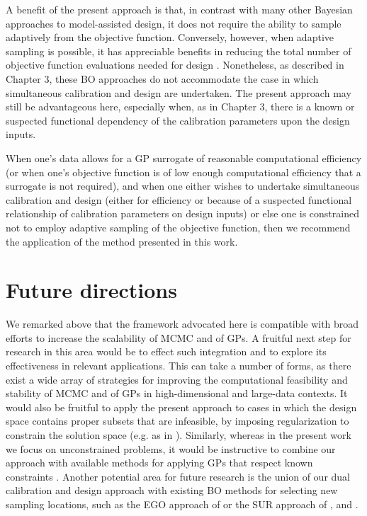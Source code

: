 \documentclass[12pt]{article}
\begin{document}
A benefit of the present approach is that, in contrast with many other Bayesian approaches to model-assisted design, it does not require the ability to sample adaptively from the objective function.
Conversely, however, when adaptive sampling is possible, it has appreciable benefits in reducing the total number of objective function evaluations needed for design \citep{Jones1998,Vazquez2009,Bect2012,Chevalier2014}.
Nonetheless, as described in Chapter 3, these BO approaches do not accommodate the case in which simultaneous calibration and design are undertaken.
The present approach may still be advantageous here, especially when, as in Chapter 3, there is a known or suspected functional dependency of the calibration parameters upon the design inputs.

When one's data allows for a GP surrogate of reasonable computational efficiency (or when one's objective function is of low enough computational efficiency that a surrogate is not required), and when one either wishes to undertake simultaneous calibration and design (either for efficiency or because of a suspected functional relationship of calibration parameters on design inputs) or else one is constrained not to employ adaptive sampling of the objective function, then we recommend the application of the method presented in this work.

\section{Future directions}

We remarked above that the framework advocated here is compatible with broad efforts to increase the scalability of MCMC and of GPs.
A fruitful next step for research in this area would be to effect such integration and to explore its effectiveness in relevant applications.
This can take a number of forms, as there exist a wide array of strategies for improving the computational feasibility and stability of MCMC and of GPs in high-dimensional and large-data contexts.
It would also be fruitful to apply the present approach to cases in which the design space contains proper subsets that are infeasible, by imposing regularization to constrain the solution space (e.g. as in \cite{Calvetti2014}).
Similarly, whereas in the present work we focus on unconstrained problems, it would be instructive to combine our approach with available methods for applying GPs that respect known constraints \citep{Golchi2015,Wang2016,Maatouk2017,Ding2019}.
Another potential area for future research is the union of our dual calibration and design approach with existing BO methods for selecting new sampling locations, such as the EGO approach of \citet{Jones1998} or the SUR approach of \citet{Vazquez2009}, \citet{Bect2012} and \citet{Chevalier2014}.




	
\end{document}
